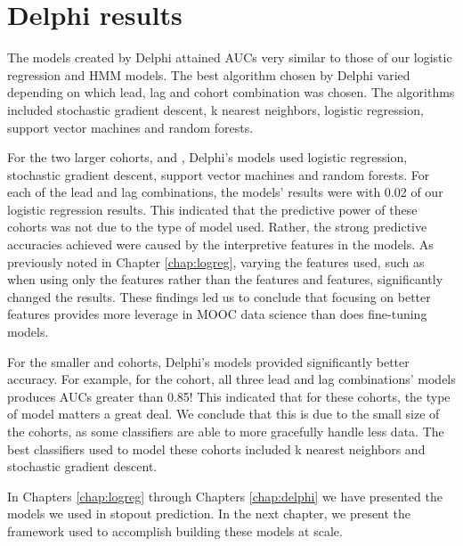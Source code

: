 \section{Delphi results}

The models created by Delphi attained AUCs very similar to those of our logistic regression and HMM models. The best algorithm chosen by Delphi varied depending on which lead, lag and cohort combination was chosen. The algorithms included stochastic gradient descent, k nearest neighbors, logistic regression, support vector machines and random forests.

For the two larger cohorts, \neither and \forum, Delphi's models used logistic regression, stochastic gradient descent, support vector machines and random forests. For each of the lead and lag combinations, the models' results were with 0.02 of our logistic regression results. This indicated that the predictive power of these cohorts was not due to the type of model used. Rather, the strong predictive accuracies achieved were caused by the interpretive features in the models. As previously noted in Chapter \ref{chap:logreg}, varying the features used, such as when using only the \selfself features rather than the \selfself features and \crowdself features, significantly changed the results. These findings led us to conclude that focusing on better features provides more leverage in MOOC data science than does fine-tuning models.

For the smaller \wiki and \both cohorts, Delphi's models provided significantly better accuracy. For example, for the \wiki cohort, all three lead and lag combinations' models produces AUCs greater than 0.85! This indicated that for these cohorts, the type of model matters a great deal. We conclude that this is due to the small size of the cohorts, as some classifiers are able to more gracefully handle less data. The best classifiers used to model these cohorts included k nearest neighbors and stochastic gradient descent.

In Chapters \ref{chap:logreg} through Chapters \ref{chap:delphi} we have presented the models we used in stopout prediction. In the next chapter, we present the framework used to accomplish building these models at scale.